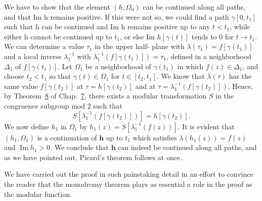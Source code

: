 We have to show that the element $(h,\Omega_{0})$ can be continued along all paths, and that Im h remains positive. If this were not so, we could find a path $\gamma[0,t_{1}]$ such that h can be continued and Im h remains positive up to any $t<t_{1}$, while either h cannot be continued up to $t_{1}$, or else Im $h[\gamma(t)]$ tends to 0 for $t\to t_{1}$. We can determine a value $\tau_{1}$ in the upper half-%
%
plane with $\lambda(\tau_1) = f[\gamma(t_1)]$ and a local inverse $\lambda_1^{-1}$ with $\lambda_1^{-1}(f[\gamma(t_1)]) = \tau_1$, defined in a neighborhood $\Delta_1$ of $f[\gamma(t_1)]$. Let $\Omega_1$ be a neighborhood of $\gamma(t_1)$ in which $f(z) \in \Delta_1$, and choose $t_2 < t_1$ so that $\gamma(t) \in \Omega_1$ for $t \in [t_2, t_1]$. We know that $\lambda(\tau)$ has the same value $f[\gamma(t_2)]$ at $\tau = h[\gamma(t_2)]$ and at $\tau = \lambda_1^{-1}(f[\gamma(t_2)])$. Hence, by Theorem~\hyperref[thm:7.8]{8} of Chap.~\hyperref[chap:7]{7}, there exists a modular transformation $S$ in the congruence subgroup mod 2 such that
\begin{equation*}
S \left[ \lambda_ {1} ^ {- 1} (f [ \gamma (t _ {2}) ]) \right] = h [ \gamma (t _ {2}) ].
\end{equation*}
We now define $h_1$ in $\Omega_1$ by $h_1(z) = S[\lambda_1^{-1}(f(z))]$. It is evident that $(h_1, \Omega_1)$ is a continuation of $\mathbf{h}$ up to $t_1$ which satisfies $\lambda(h_1(z)) = f(z)$ and $\operatorname{Im} h_1 > 0$. We conclude that $\mathbf{h}$ can indeed be continued along all paths, and as we have pointed out, Picard's theorem follows at once.

We have carried out the proof in such painstaking detail in an effort to convince the reader that the monodromy theorem plays as essential a role in the proof as the modular function.


